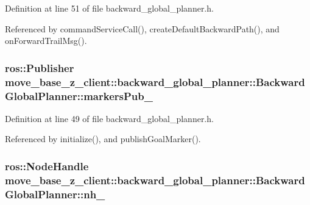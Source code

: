 Definition at line 51 of file backward\+\_\+global\+\_\+planner.\+h.



Referenced by command\+Service\+Call(), create\+Default\+Backward\+Path(), and on\+Forward\+Trail\+Msg().

\subsubsection[{\texorpdfstring{markers\+Pub\+\_\+}{markersPub_}}]{\setlength{\rightskip}{0pt plus 5cm}ros\+::\+Publisher move\+\_\+base\+\_\+z\+\_\+client\+::backward\+\_\+global\+\_\+planner\+::\+Backward\+Global\+Planner\+::markers\+Pub\+\_\+\hspace{0.3cm}{\ttfamily [private]}}\hypertarget{classmove__base__z__client_1_1backward__global__planner_1_1BackwardGlobalPlanner_a52a247da9267a83e51679d41e09f11a4}{}\label{classmove__base__z__client_1_1backward__global__planner_1_1BackwardGlobalPlanner_a52a247da9267a83e51679d41e09f11a4}


Definition at line 49 of file backward\+\_\+global\+\_\+planner.\+h.



Referenced by initialize(), and publish\+Goal\+Marker().

\subsubsection[{\texorpdfstring{nh\+\_\+}{nh_}}]{\setlength{\rightskip}{0pt plus 5cm}ros\+::\+Node\+Handle move\+\_\+base\+\_\+z\+\_\+client\+::backward\+\_\+global\+\_\+planner\+::\+Backward\+Global\+Planner\+::nh\+\_\+\hspace{0.3cm}{\ttfamily [private]}}\hypertarget{classmove__base__z__client_1_1backward__global__planner_1_1BackwardGlobalPlanner_acc560c431ab390c2c32ba27fdbec95e6}{}\label{classmove__base__z__client_1_1backward__global__planner_1_1BackwardGlobalPlanner_acc560c431ab390c2c32ba27fdbec95e6}



